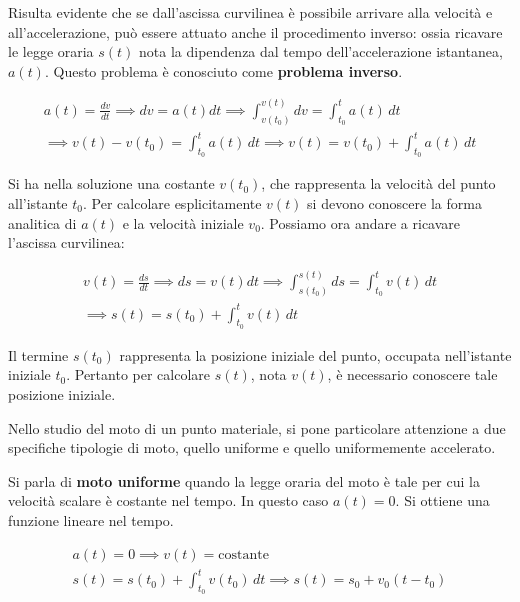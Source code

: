 Risulta evidente che se dall'ascissa curvilinea è possibile arrivare alla velocità e all'accelerazione, può essere attuato anche il procedimento inverso: ossia ricavare le legge oraria $s(t)$ nota la dipendenza dal tempo dell'accelerazione istantanea, $a(t)$. Questo problema è conosciuto come \textbf{problema inverso}.

\begin{gather*}
	a(t)=\frac{dv}{dt} \implies dv=a(t) dt \implies \int^{v(t)}_{v(t_0)} dv = \int^t_{t_0} a(t)\,dt \\
	\implies v(t)-v(t_0)=\int^t_{t_0} a(t)\,dt \implies v(t) = v(t_0)+\int^t_{t_0} a(t)\,dt
\end{gather*}

Si ha nella soluzione una costante $v(t_0)$, che rappresenta la velocità del punto all'istante $t_0$. Per calcolare esplicitamente $v(t)$ si devono conoscere la forma analitica di $a(t)$ e la velocità iniziale $v_0$.
Possiamo ora andare a ricavare l'ascissa curvilinea:

\begin{gather*}
	v(t)=\frac{ds}{dt} \implies ds=v(t) dt \implies \int^{s(t)}_{s(t_0)} ds = \int^t_{t_0} v(t)\,dt \\
	\implies s(t)=s(t_0)+\int^t_{t_0} v(t) \,dt
\end{gather*}

Il termine $s(t_0)$ rappresenta la posizione iniziale del punto, occupata nell'istante iniziale $t_0$. Pertanto per calcolare $s(t)$, nota $v(t)$, è necessario conoscere tale posizione iniziale.

Nello studio del moto di un punto materiale, si pone particolare attenzione a due specifiche tipologie di moto, quello uniforme e quello uniformemente accelerato.

Si parla di \textbf{moto uniforme} quando la legge oraria del moto è tale per cui la velocità scalare è costante nel tempo. In questo caso $a(t)=0$. Si ottiene una funzione lineare nel tempo.

\begin{gather*}
	a(t)=0 \implies v(t)=\text{costante} \\
	s(t)=s(t_0)+ \int^t_{t_0} v(t_0) \,dt \implies s(t)=s_0 + v_0 (t - t_0)
\end{gather*}

